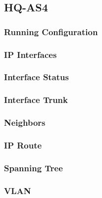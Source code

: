 \subsection{HQ-AS4}
\subsubsection{Running Configuration}


\subsubsection{IP Interfaces}


\subsubsection{Interface Status}


\subsubsection{Interface Trunk}


\subsubsection{Neighbors}


\subsubsection{IP Route}


\subsubsection{Spanning Tree}


\subsubsection{VLAN}





